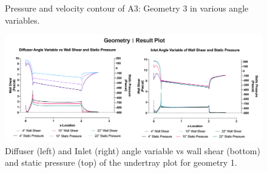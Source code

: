 \begin{figure}
    \noindent{}
    \caption{Pressure and velocity contour of A3: Geometry 3 in various angle variables.}
    \label{fig:2D_OF_A3_Contour2}
\end{figure}


\begin{figure}
    \centering
    \includegraphics[scale=0.8]{Figures/2D_OF/2D_OF_A1_PRESS_WShear_PLOT.png}
    \caption{Diffuser (left) and Inlet (right) angle variable vs wall shear (bottom) and static pressure (top) of the undertray plot for geometry 1.}
    \label{fig:2D_OF_A1_PLOT}
\end{figure}

